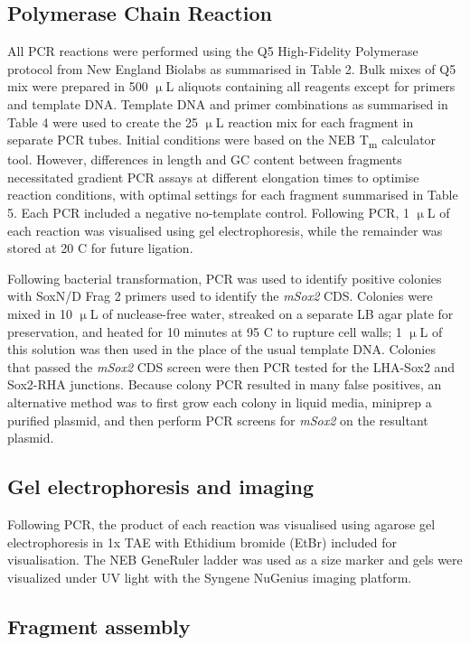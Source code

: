 \documentclass[withindex,glossary]{cam-thesis}
\begin{document}
\subsection{Polymerase Chain Reaction}

All \gls{PCR} reactions were performed using the Q5 High-Fidelity Polymerase
protocol from New England Biolabs as summarised in Table 2. Bulk mixes
of Q5 mix were prepared in 500 $\upmu{}$L aliquots containing all reagents
except for primers and template DNA. Template DNA and primer
combinations as summarised in Table 4 were used to create the 25 $\upmu{}$L
reaction mix for each fragment in separate PCR tubes. Initial conditions
were based on the NEB T\textsubscript{m} calculator tool. However,
differences in length and GC content between fragments necessitated
gradient PCR assays at different elongation times to optimise reaction
conditions, with optimal settings for each fragment summarised in Table
5. Each PCR included a negative no-template control. Following PCR, 1 $\upmu{}$L
of each reaction was visualised using gel electrophoresis, while the
remainder was stored at \textminus{}20 \textdegree{}C for future ligation.

Following bacterial transformation, PCR was used to identify positive
colonies with SoxN/D Frag 2 primers used to identify the \emph{mSox2}
CDS. Colonies were mixed in 10 $\upmu{}$L of nuclease-free water, streaked on a
separate LB agar plate for preservation, and heated for 10 minutes at 95
\textdegree{}C to rupture cell walls; 1 $\upmu{}$L of this solution was then used in the
place of the usual template DNA. Colonies that passed the \emph{mSox2}
CDS screen were then PCR tested for the LHA-Sox2 and Sox2-RHA junctions.
Because colony PCR resulted in many false positives, an alternative
method was to first grow each colony in liquid media, miniprep a
purified plasmid, and then perform PCR screens for \emph{mSox2} on the
resultant plasmid.

\subsection{Gel electrophoresis and imaging}

Following PCR, the product of each reaction was visualised using agarose
gel electrophoresis in 1x TAE with Ethidium bromide (\gls{EtBr}) included for
visualisation. The NEB GeneRuler ladder was used as a size marker and
gels were visualized under UV light with the Syngene NuGenius imaging
platform.

\subsection{Fragment assembly}
\end{document}
